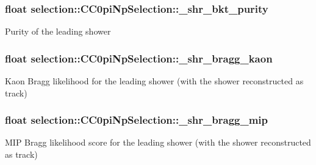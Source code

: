 \subsubsection[{\texorpdfstring{\+\_\+shr\+\_\+bkt\+\_\+purity}{_shr_bkt_purity}}]{\setlength{\rightskip}{0pt plus 5cm}float selection\+::\+C\+C0pi\+Np\+Selection\+::\+\_\+shr\+\_\+bkt\+\_\+purity\hspace{0.3cm}{\ttfamily [private]}}\hypertarget{classselection_1_1CC0piNpSelection_a1da68886d5b7a5b4eb1785649c48e8ef}{}\label{classselection_1_1CC0piNpSelection_a1da68886d5b7a5b4eb1785649c48e8ef}
Purity of the leading shower 
\subsubsection[{\texorpdfstring{\+\_\+shr\+\_\+bragg\+\_\+kaon}{_shr_bragg_kaon}}]{\setlength{\rightskip}{0pt plus 5cm}float selection\+::\+C\+C0pi\+Np\+Selection\+::\+\_\+shr\+\_\+bragg\+\_\+kaon\hspace{0.3cm}{\ttfamily [private]}}\hypertarget{classselection_1_1CC0piNpSelection_a0fae2cdec5a695421cbe2fdfe6e61c9d}{}\label{classselection_1_1CC0piNpSelection_a0fae2cdec5a695421cbe2fdfe6e61c9d}
Kaon Bragg likelihood for the leading shower (with the shower reconstructed as track) 
\subsubsection[{\texorpdfstring{\+\_\+shr\+\_\+bragg\+\_\+mip}{_shr_bragg_mip}}]{\setlength{\rightskip}{0pt plus 5cm}float selection\+::\+C\+C0pi\+Np\+Selection\+::\+\_\+shr\+\_\+bragg\+\_\+mip\hspace{0.3cm}{\ttfamily [private]}}\hypertarget{classselection_1_1CC0piNpSelection_ae18587d33433c508bd3e371de8db7b32}{}\label{classselection_1_1CC0piNpSelection_ae18587d33433c508bd3e371de8db7b32}
M\+IP Bragg likelihood score for the leading shower (with the shower reconstructed as track) 
